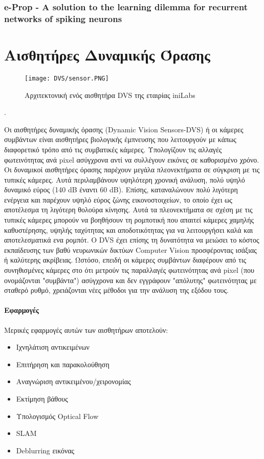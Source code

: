 \documentclass[12pt]{report}
\begin{document}
\subsection{e-Prop - A solution to the learning dilemma for recurrent networks of spiking neurons}
\chapter{Αισθητήρες Δυναμικής Όρασης}

\begin{wrapfigure}{r}{0.25\textwidth} %
    \centering
     \texttt{[image: DVS/sensor.PNG]}
    \caption{Αρχιτεκτονική ενός αισθητήρα \textlatin{DVS} της εταιρίας \textlatin{iniLabs} }
    \label{fig:dvs-sensor}
\end{wrapfigure}.

Οι αισθητήρες δυναμικής όρασης (\textlatin{Dynamic Vision Sensors}-\textlatin{DVS}) ή οι κάμερες συμβάντων είναι αισθητήρες βιολογικής έμπνευσης που λειτουργούν με κάπως διαφορετικό τρόπο από τις συμβατικές κάμερες. Υπολογίζουν τις αλλαγές φωτεινότητας ανά \textlatin{pixel} ασύγχρονα αντί να συλλέγουν εικόνες σε καθορισμένο χρόνο. Οι δυναμικοί αισθητήρες όρασης παρέχουν μεγάλα πλεονεκτήματα σε σύγκριση με τις τυπικές κάμερες. Αυτά περιλαμβάνουν υψηλότερη χρονική ανάλυση, πολύ υψηλό δυναμικό εύρος (140 \textlatin{dB} έναντι 60 \textlatin{dB}). Επίσης, καταναλώνουν πολύ λιγότερη ενέργεια και παρέχουν υψηλό εύρος ζώνης εικονοστοιχείων, το οποίο έχει ως αποτέλεσμα τη λιγότερη θολούρα κίνησης. Αυτά τα πλεονεκτήματα σε σχέση με τις τυπικές κάμερες μπορούν να βοηθήσουν τη ρομποτική που απαιτεί κάμερες χαμηλής καθυστέρησης, υψηλής ταχύτητας και αποδοτικότητας για να λειτουργήσει καλά και αποτελεσματικά ενα ρομπότ. Ο \textlatin{DVS} έχει επίσης τη δυνατότητα να μειώσει το κόστος εκπαίδευσης των βαθύ νευρωνικών δικτύων \textlatin{Computer Vision} προσφέροντας ισάξιας ή καλύτερης ακρίβειας. Ωστόσο, επειδή οι κάμερες συμβάντων διαφέρουν από τις συνηθισμένες κάμερες στο ότι μετρούν τις παραλλαγές φωτεινότητας ανά \textlatin{pixel} (που ονομάζονται "συμβάντα") ασύγχρονα και δεν εγγράφουν "απόλυτης" φωτεινότητας με σταθερό ρυθμό, χρειάζονται νέες μέθοδοι για την ανάλυση της εξόδου τους.

\subsubsection{Εφαρμογές}
Μερικές εφαρμογές αυτών των αισθητήρων αποτελούν:
\begin{itemize}
    \item Ιχνηλάτιση αντικειμένων
    \item Επιτήρηση και παρακολούθηση
    \item Αναγνώριση αντικειμένου/χειρονομίας
    \item Εκτίμηση βάθους 
    \item Υπολογισμός \textlatin{Optical Flow}
    \item \textlatin{SLAM}
    \item \textlatin{Deblurring} εικόνας
\end{itemize}
\end{document}
